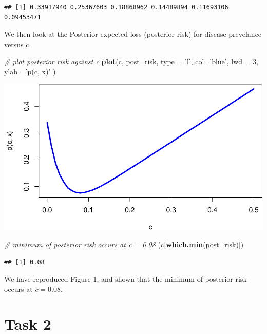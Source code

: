 \documentclass[
]{article}
\newenvironment{Shaded}{\begin{snugshade}}{\end{snugshade}}
\newcommand{\CommentTok}[1]{\textcolor[rgb]{0.56,0.35,0.01}{\textit{#1}}}
\newcommand{\DataTypeTok}[1]{\textcolor[rgb]{0.13,0.29,0.53}{#1}}
\newcommand{\DecValTok}[1]{\textcolor[rgb]{0.00,0.00,0.81}{#1}}
\newcommand{\KeywordTok}[1]{\textcolor[rgb]{0.13,0.29,0.53}{\textbf{#1}}}
\newcommand{\NormalTok}[1]{#1}
\newcommand{\StringTok}[1]{\textcolor[rgb]{0.31,0.60,0.02}{#1}}
\begin{document}
\begin{verbatim}
## [1] 0.33917940 0.25367603 0.18868962 0.14489894 0.11693106 0.09453471
\end{verbatim}

We then look at the Posterior expected loss (posterior risk) for disease
prevelance versus c.~

\begin{Shaded}
\begin{Highlighting}[]
\CommentTok{# plot posterior risk against c }
\KeywordTok{plot}\NormalTok{(c, post_risk, }\DataTypeTok{type =} \StringTok{'l'}\NormalTok{, }\DataTypeTok{col=}\StringTok{'blue'}\NormalTok{, }
    \DataTypeTok{lwd =} \DecValTok{3}\NormalTok{, }\DataTypeTok{ylab =}\StringTok{'p(c, x)'}\NormalTok{ )}
\end{Highlighting}
\end{Shaded}

\includegraphics{lab-03_files/figure-latex/unnamed-chunk-4-1.pdf}

\begin{Shaded}
\begin{Highlighting}[]
\CommentTok{# minimum of posterior risk occurs at c = 0.08}
\NormalTok{(c[}\KeywordTok{which.min}\NormalTok{(post_risk)])}
\end{Highlighting}
\end{Shaded}

\begin{verbatim}
## [1] 0.08
\end{verbatim}

We have reproduced Figure 1, and shown that the minimum of posterior
risk occurs at \(c = 0.08.\)

\hypertarget{task-2}{%
\section{Task 2}\label{task-2}}
\end{document}
